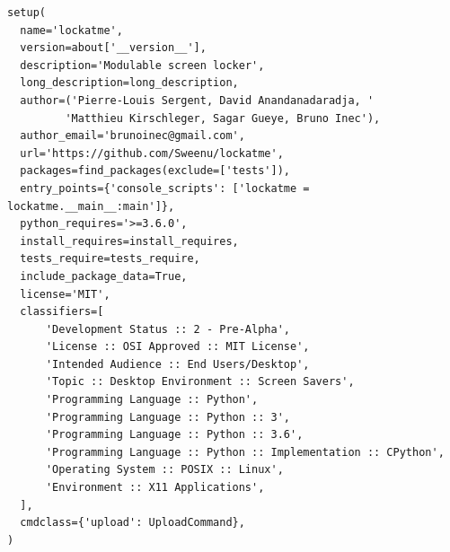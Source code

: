 \documentclass[french]{report}
\begin{document}
\begin{verbatim}
setup(
  name='lockatme',
  version=about['__version__'],
  description='Modulable screen locker',
  long_description=long_description,
  author=('Pierre-Louis Sergent, David Anandanadaradja, '
         'Matthieu Kirschleger, Sagar Gueye, Bruno Inec'),
  author_email='brunoinec@gmail.com',
  url='https://github.com/Sweenu/lockatme',
  packages=find_packages(exclude=['tests']),
  entry_points={'console_scripts': ['lockatme = lockatme.__main__:main']},
  python_requires='>=3.6.0',
  install_requires=install_requires,
  tests_require=tests_require,
  include_package_data=True,
  license='MIT',
  classifiers=[
      'Development Status :: 2 - Pre-Alpha',
      'License :: OSI Approved :: MIT License',
      'Intended Audience :: End Users/Desktop',
      'Topic :: Desktop Environment :: Screen Savers',
      'Programming Language :: Python',
      'Programming Language :: Python :: 3',
      'Programming Language :: Python :: 3.6',
      'Programming Language :: Python :: Implementation :: CPython',
      'Operating System :: POSIX :: Linux',
      'Environment :: X11 Applications',
  ],
  cmdclass={'upload': UploadCommand},
)

\end{verbatim}
\end{document}
